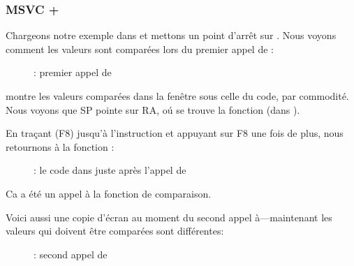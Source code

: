 ﻿\clearpage
\subsubsection{MSVC + \olly}
\myindex{\olly}

Chargeons notre exemple dans \olly et mettons un point d'arrêt sur \comp.
Nous voyons comment les valeurs sont comparées lors du premier appel de \comp:

\begin{figure}[H]
\centering
{}
\caption{\olly: premier appel de \comp}
\label{fig:qsort_olly1}
\end{figure}

\olly montre les valeurs comparées dans la fenêtre sous celle du code, par commodité.
Nous voyons que \ac{SP} pointe sur \ac{RA}, oú se trouve la fonction \qsort (dans
).

\clearpage
En traçant (F8) jusqu'à l'instruction  et appuyant sur F8 une fois de plus,
nous retournons à la fonction \qsort:

\begin{figure}[H]
\centering
{}
\caption{\olly: le code dans \qsort juste après l'appel de \comp}
\label{fig:qsort_olly2}
\end{figure}

Ca a été un appel à la fonction de comparaison.

\clearpage
Voici aussi une copie d'écran au moment du second appel à\comp{}---maintenant les
valeurs qui doivent être comparées sont différentes:

\begin{figure}[H]
\centering
{}
\caption{\olly: second appel de \comp}
\label{fig:qsort_olly3}
\end{figure}
